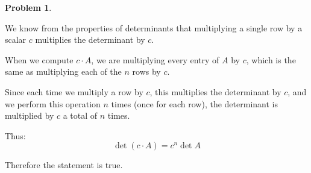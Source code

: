 \documentclass[12pt, oneside]{amsart}
\theoremstyle{definition}
\newtheorem{prob}{Problem}
\begin{document}
\begin{prob}
\begin{enumerate}
    \begin{solution}
    We know from the properties of determinants that multiplying a single row by a scalar $c$ multiplies the determinant by $c$.
    
    When we compute $c \cdot A$, we are multiplying every entry of $A$ by $c$, which is the same as multiplying each of the $n$ rows by $c$.
    
    Since each time we multiply a row by $c$, this multiplies the determinant by $c$, and we perform this operation $n$ times (once for each row), the determinant is multiplied by $c$ a total of $n$ times.

    Thus:
    \[
    \det(c \cdot A) = c^n \det A
    \]
    
    Therefore the statement is true.
    \end{solution}
\end{enumerate}
\end{prob}
\end{document}
